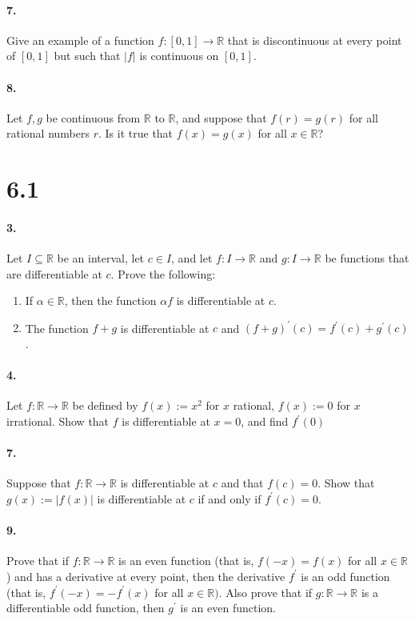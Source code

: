 \documentclass[12pt]{article}
\theoremstyle{remark}
\begin{document}
\paragraph{7.} Give an example of a function $f:[0,1] \rightarrow \mathbb{R}$ that is discontinuous at every point of $[0,1]$ but such that $|f|$ is continuous on $[0,1]$.

\paragraph{8.} Let $f, g$ be continuous from $\mathbb{R}$ to $\mathbb{R}$, and suppose that $f(r)=g(r)$ for all rational numbers $r$. Is it true that $f(x)=g(x)$ for all $x \in \mathbb{R}$?

\section*{6.1}
\paragraph{3.} Let $I \subseteq \mathbb{R}$ be an interval, let $c \in I$, and let $f: I \rightarrow \mathbb{R}$ and $g: I \rightarrow \mathbb{R}$ be functions that are differentiable at $c$. Prove the following:
\begin{enumerate}[label=(\alph*)]
    \item If $\alpha \in \mathbb{R}$, then the function $\alpha f$ is differentiable at $c$.
    \item The function $f + g$ is differentiable at $c$ and $(f + g)^{\prime}(c) = f^{\prime}(c) + g^{\prime}(c)$.
\end{enumerate}

\paragraph{4.} Let $f: \mathbb{R} \rightarrow \mathbb{R}$ be defined by $f(x):=x^2$ for $x$ rational, $f(x):=0$ for $x$ irrational. Show that $f$ is differentiable at $x=0$, and find $f^{\prime}(0)$

\paragraph{7.} Suppose that $f: \mathbb{R} \rightarrow \mathbb{R}$ is differentiable at $c$ and that $f(c)=0$. Show that $g(x):=|f(x)|$ is differentiable at $c$ if and only if $f^{\prime}(c)=0$.

\paragraph{9.} Prove that if $f: \mathbb{R} \rightarrow \mathbb{R}$ is an even function (that is, $f(-x)=f(x)$ for all $x \in \mathbb{R}$) and has a derivative at every point, then the derivative $f^{\prime}$ is an odd function (that is, $f^{\prime}(-x)=-f^{\prime}(x)$ for all $x \in \mathbb{R})$. Also prove that if $g: \mathbb{R} \rightarrow \mathbb{R}$ is a differentiable odd function, then $g^{\prime}$ is an even function.
\end{document}
